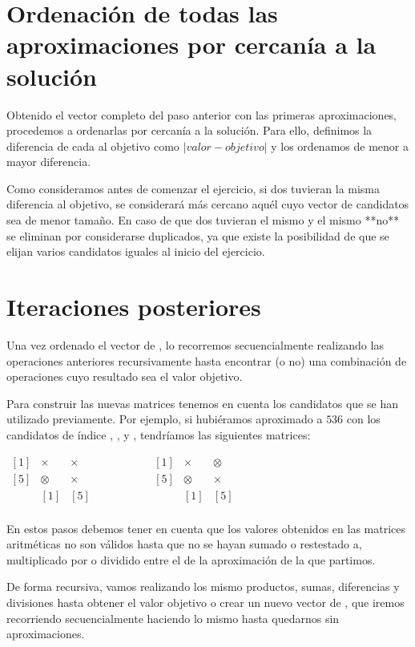 \section{Ordenación de todas las aproximaciones por cercanía a la solución}

Obtenido el vector completo del paso anterior con las primeras aproximaciones, procedemos a ordenarlas por cercanía a la solución.
Para ello, definimos la diferencia de cada  al objetivo como $|valor-objetivo|$ y los ordenamos de menor a mayor diferencia.

\pagebreak

Como consideramos antes de comenzar el ejercicio, si dos  tuvieran la misma diferencia al objetivo, se considerará más cercano aquél cuyo vector de candidatos sea de menor tamaño.
En caso de que dos  tuvieran el mismo  y el mismo  **no** se eliminan por considerarse duplicados, ya que existe la posibilidad de que se elijan varios candidatos iguales al inicio del ejercicio.

\section{Iteraciones posteriores}

Una vez ordenado el vector de , lo recorremos secuencialmente realizando las operaciones anteriores recursivamente hasta encontrar (o no) una combinación de operaciones cuyo resultado sea el valor objetivo.

Para construir las nuevas matrices tenemos en cuenta los candidatos que se han utilizado previamente.
Por ejemplo, si hubiéramos aproximado a $536$ con los candidatos de índice , ,  y , tendríamos las siguientes matrices:

\begin{center}
$\begin{matrix}
[1] & \times  & \times \\
[5] & \otimes & \times \\
    &   [1]   &   [5]  \\
\end{matrix}
\ \ \ \ \ \ \ \ \ \ \ \ \ \ \ \ \ \ \ \ \ \ \begin{matrix}
[1] & \times  & \otimes \\
[5] & \otimes & \times  \\
    &   [1]   &    [5]  \\
\end{matrix}$
\end{center}

En estos pasos debemos tener en cuenta que los valores obtenidos en las matrices aritméticas no son válidos hasta que no se hayan sumado o restestado a, multiplicado por o dividido entre el  de la aproximación de la que partimos.

De forma recursiva, vamos realizando los mismo productos, sumas, diferencias y divisiones hasta obtener el valor objetivo o crear un nuevo vector de , que iremos recorriendo secuencialmente haciendo lo mismo hasta quedarnos sin aproximaciones.
